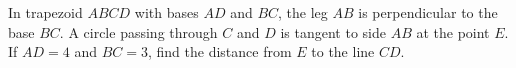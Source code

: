 In trapezoid $ABCD$ with bases $AD$ and $BC$, the leg $AB$ is perpendicular to the base $BC$. A circle passing through $C$ and $D$ is tangent to side $AB$ at the point $E$. If $AD=4$ and $BC=3$, find the distance from $E$ to the line $CD$.
